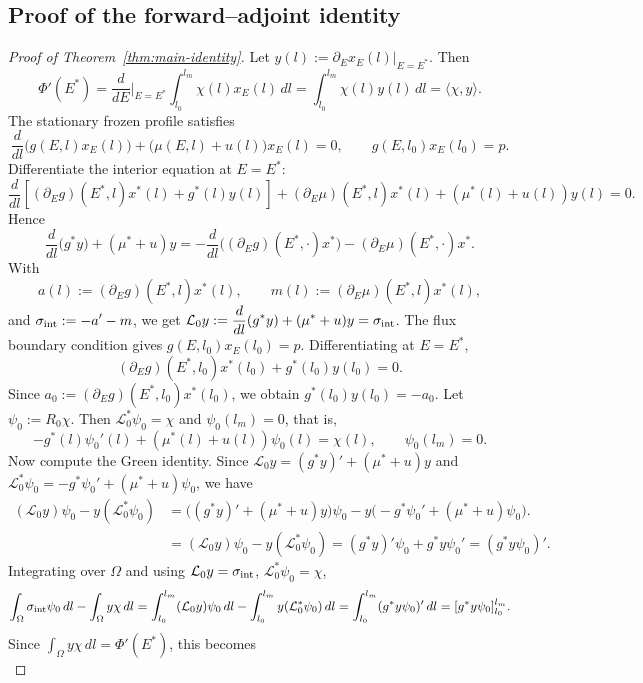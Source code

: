 \documentclass[pdflatex,sn-mathphys-num]{sn-jnl}
\theoremstyle{thmstyleone}
\theoremstyle{definition}
\theoremstyle{remark}
\newcommand{\Om}{\Omega}
\newcommand{\Lcal}{\mathcal{L}}
\numberwithin{equation}{section}
\begin{document}
\subsection{Proof of the forward--adjoint identity}
\label{subsec:proof-identity}
\begin{proof}[Proof of Theorem~\ref{thm:main-identity}]
Let
$\displaystyle 
y(l):=\partial_E x_E(l)\big|_{E=E^*}$.
Then
\[
\Phi'(E^*)
=
\frac{d}{dE}\bigg|_{E=E^*}\int_{l_0}^{l_m}\chi(l)x_E(l)\,dl
=
\int_{l_0}^{l_m}\chi(l)y(l)\,dl
=
\langle\chi,y\rangle.
\]
The stationary frozen profile satisfies
\[
\frac{d}{dl}\big(g(E,l)x_E(l)\big)
+
\big(\mu(E,l)+u(l)\big)x_E(l)
=0,
\qquad
g(E,l_0)x_E(l_0)=p .
\]
Differentiate the interior equation at \(E=E^*\):
\[
\frac{d}{dl}
\left[
(\partial_Eg)(E^*,l)x^*(l)+g^*(l)y(l)
\right]
+
(\partial_E\mu)(E^*,l)x^*(l)
+
(\mu^*(l)+u(l))y(l)
=0 .
\]
Hence
\[
\frac{d}{dl}\big(g^*y\big)
+
(\mu^*+u)y
=
-\frac{d}{dl}\big((\partial_Eg)(E^*,\cdot)x^*\big)
-
(\partial_E\mu)(E^*,\cdot)x^* .
\]
With
\[
a(l):=(\partial_Eg)(E^*,l)x^*(l),
\qquad
m(l):=(\partial_E\mu)(E^*,l)x^*(l),
\]
and
$\displaystyle 
\sigma_{\rm int}:=-a'-m$,
we get
$\displaystyle 
\Lcal_0y
:=
\frac{d}{dl}(g^*y)+(\mu^*+u)y
=
\sigma_{\rm int}$.
The flux boundary condition gives
$\displaystyle 
g(E,l_0)x_E(l_0)=p$.
Differentiating at \(E=E^*\),
\[
(\partial_Eg)(E^*,l_0)x^*(l_0)+g^*(l_0)y(l_0)=0.
\]
Since
$\displaystyle 
a_0:=(\partial_Eg)(E^*,l_0)x^*(l_0)$,
we obtain
$\displaystyle 
g^*(l_0)y(l_0)=-a_0$.
Let
$\displaystyle 
\psi_0:=R_0\chi$.
Then
$\Lcal_0^*\psi_0=\chi$ and
$\psi_0(l_m)=0$,
that is,
\[
-g^*(l)\psi_0'(l)
+
(\mu^*(l)+u(l))\psi_0(l)
=
\chi(l),
\qquad
\psi_0(l_m)=0 .
\]
Now compute the Green identity. Since
$\Lcal_0y=(g^*y)'+(\mu^*+u)y$ and
$\Lcal_0^*\psi_0=-g^*\psi_0'+(\mu^*+u)\psi_0$,
we have
\[
\begin{aligned}
(\Lcal_0y)\psi_0-y(\Lcal_0^*\psi_0)
&=
\big((g^*y)'+(\mu^*+u)y\big)\psi_0
-
y\big(-g^*\psi_0'+(\mu^*+u)\psi_0\big).\\[4pt]
&=(\Lcal_0y)\psi_0-y(\Lcal_0^*\psi_0)
=
(g^*y)'\psi_0+g^*y\psi_0'
=
(g^*y\psi_0)'.
\end{aligned}
\]
Integrating over \(\Om\) and using $\Lcal_0y=\sigma_{\rm int}$, $\Lcal_0^*\psi_0=\chi$,
\[
\int_{\Om}\sigma_{\rm int}\psi_0\,dl
-
\int_{\Om}y\chi\,dl
=\int_{l_0}^{l_m}(\Lcal_0y)\psi_0\,dl
-
\int_{l_0}^{l_m}y(\Lcal_0^*\psi_0)\,dl
=
\int_{l_0}^{l_m}(g^*y\psi_0)'\,dl
=
[g^*y\psi_0]_{l_0}^{l_m}.
\]
Since
$\displaystyle 
\int_{\Om}y\chi\,dl=\Phi'(E^*)$,
this becomes
\begin{equation}

\end{equation}
\end{proof}
\end{document}

